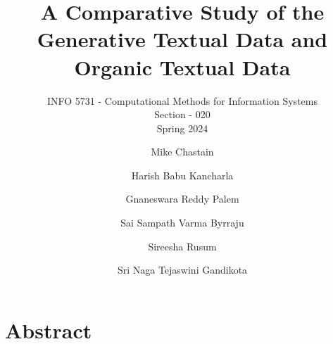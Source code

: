 \documentclass[sigplan,screen]{acmart}
\begin{document}
\title{A Comparative Study of the Generative Textual Data and Organic Textual Data}
\subtitle{INFO 5731 - Computational Methods for Information Systems\\
Section - 020\\Spring 2024
}

\author{Mike Chastain}

\author{Harish Babu Kancharla}

\author{Gnaneswara Reddy Palem}

\author{Sai Sampath Varma Byrraju}

\author{Sireesha Rusum}

\author{Sri Naga Tejaswini Gandikota}


\renewcommand{\shortauthors}{}




\maketitle
\section{Abstract}
\end{document}
